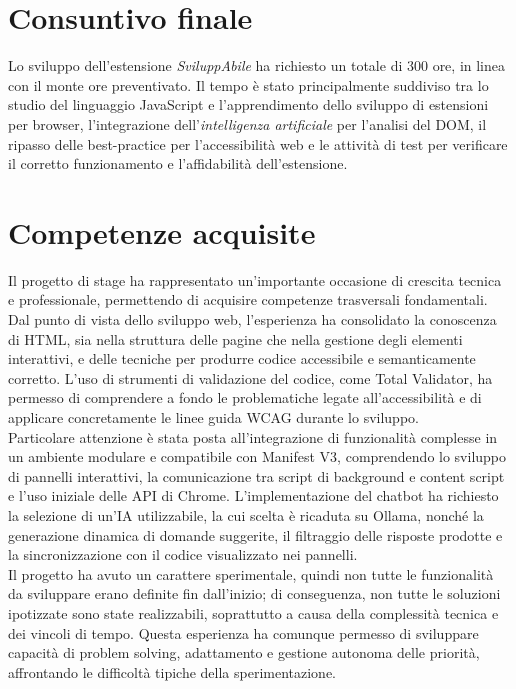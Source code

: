 \section{Consuntivo finale}
\noindent Lo sviluppo dell’estensione \textit{SviluppAbile} ha richiesto un totale di 300 ore, in linea con il monte ore preventivato. Il tempo è stato principalmente suddiviso tra lo studio del linguaggio JavaScript e l’apprendimento dello sviluppo di estensioni per browser, l’integrazione dell'\textit{intelligenza artificiale} per l’analisi del DOM, il ripasso delle best-practice per l'accessibilità web e le attività di test per verificare il corretto funzionamento e l’affidabilità dell’estensione. 

\section{Competenze acquisite}
\noindent Il progetto di stage ha rappresentato un’importante occasione di crescita tecnica e professionale, permettendo di acquisire competenze trasversali fondamentali. Dal punto di vista dello sviluppo web, l’esperienza ha consolidato la conoscenza di HTML, sia nella struttura delle pagine che nella gestione degli elementi interattivi, e delle tecniche per produrre codice accessibile e semanticamente corretto. L’uso di strumenti di validazione del codice, come Total Validator, ha permesso di comprendere a fondo le problematiche legate all’accessibilità e di applicare concretamente le linee guida WCAG durante lo sviluppo.\\
Particolare attenzione è stata posta all’integrazione di funzionalità complesse in un ambiente modulare e compatibile con Manifest V3, comprendendo lo sviluppo di pannelli interattivi, la comunicazione tra script di background e content script e l’uso iniziale delle API di Chrome. L’implementazione del chatbot ha richiesto la selezione di un’IA utilizzabile, la cui scelta è ricaduta su Ollama, nonché la generazione dinamica di domande suggerite, il filtraggio delle risposte prodotte e la sincronizzazione con il codice visualizzato nei pannelli.\\
Il progetto ha avuto un carattere sperimentale, quindi non tutte le funzionalità da sviluppare erano definite fin dall’inizio; di conseguenza, non tutte le soluzioni ipotizzate sono state realizzabili, soprattutto a causa della complessità tecnica e dei vincoli di tempo. Questa esperienza ha comunque permesso di sviluppare capacità di problem solving, adattamento e gestione autonoma delle priorità, affrontando le difficoltà tipiche della sperimentazione.\\
